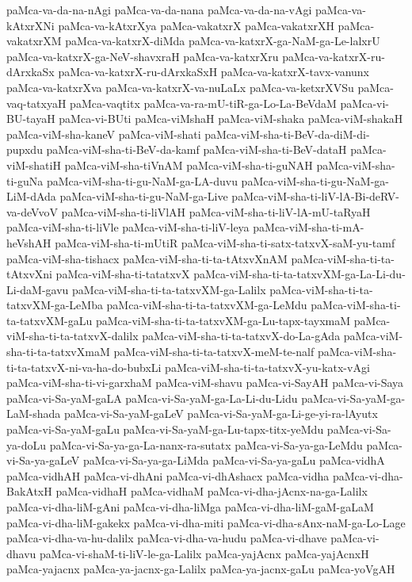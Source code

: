 {paMca-va-da-na-nAgi
paMca-va-da-nana
paMca-va-da-na-vAgi
paMca-va-kAtxrXNi
paMca-va-kAtxrXya
paMca-vakatxrX
paMca-vakatxrXH
paMca-vakatxrXM
paMca-va-katxrX-diMda
paMca-va-katxrX-ga-NaM-ga-Le-lalxrU
paMca-va-katxrX-ga-NeV-shavxraH
paMca-va-katxrXru
paMca-va-katxrX-ru-dArxkaSx
paMca-va-katxrX-ru-dArxkaSxH
paMca-va-katxrX-tavx-vanunx
paMca-va-katxrXva
paMca-va-katxrX-va-nuLaLx
paMca-va-ketxrXVSu
paMca-vaq-tatxyaH
paMca-vaqtitx
paMca-va-ra-mU-tiR-ga-Lo-La-BeVdaM
paMca-vi-BU-tayaH
paMca-vi-BUti
paMca-viMshaH
paMca-viM-shaka
paMca-viM-shakaH
paMca-viM-sha-kaneV
paMca-viM-shati
paMca-viM-sha-ti-BeV-da-diM-di-pupxdu
paMca-viM-sha-ti-BeV-da-kamf
paMca-viM-sha-ti-BeV-dataH
paMca-viM-shatiH
paMca-viM-sha-tiVnAM
paMca-viM-sha-ti-guNAH
paMca-viM-sha-ti-guNa
paMca-viM-sha-ti-gu-NaM-ga-LA-duvu
paMca-viM-sha-ti-gu-NaM-ga-LiM-dAda
paMca-viM-sha-ti-gu-NaM-ga-Live
paMca-viM-sha-ti-liV-lA-Bi-deRV-va-deVvoV
paMca-viM-sha-ti-liVlAH
paMca-viM-sha-ti-liV-lA-mU-taRyaH
paMca-viM-sha-ti-liVle
paMca-viM-sha-ti-liV-leya
paMca-viM-sha-ti-mA-heVshAH
paMca-viM-sha-ti-mUtiR
paMca-viM-sha-ti-satx-tatxvX-saM-yu-tamf
paMca-viM-sha-tishacx
paMca-viM-sha-ti-ta-tAtxvXnAM
paMca-viM-sha-ti-ta-tAtxvXni
paMca-viM-sha-ti-tatatxvX
paMca-viM-sha-ti-ta-tatxvXM-ga-La-Li-du-Li-daM-gavu
paMca-viM-sha-ti-ta-tatxvXM-ga-Lalilx
paMca-viM-sha-ti-ta-tatxvXM-ga-LeMba
paMca-viM-sha-ti-ta-tatxvXM-ga-LeMdu
paMca-viM-sha-ti-ta-tatxvXM-gaLu
paMca-viM-sha-ti-ta-tatxvXM-ga-Lu-tapx-tayxmaM
paMca-viM-sha-ti-ta-tatxvX-dalilx
paMca-viM-sha-ti-ta-tatxvX-do-La-gAda
paMca-viM-sha-ti-ta-tatxvXmaM
paMca-viM-sha-ti-ta-tatxvX-meM-te-nalf
paMca-viM-sha-ti-ta-tatxvX-ni-va-ha-do-bubxLi
paMca-viM-sha-ti-ta-tatxvX-yu-katx-vAgi
paMca-viM-sha-ti-vi-garxhaM
paMca-viM-shavu
paMca-vi-SayAH
paMca-vi-Saya
paMca-vi-Sa-yaM-gaLA
paMca-vi-Sa-yaM-ga-La-Li-du-Lidu
paMca-vi-Sa-yaM-ga-LaM-shada
paMca-vi-Sa-yaM-gaLeV
paMca-vi-Sa-yaM-ga-Li-ge-yi-ra-lAyutx
paMca-vi-Sa-yaM-gaLu
paMca-vi-Sa-yaM-ga-Lu-tapx-titx-yeMdu
paMca-vi-Sa-ya-doLu
paMca-vi-Sa-ya-ga-La-nanx-ra-sutatx
paMca-vi-Sa-ya-ga-LeMdu
paMca-vi-Sa-ya-gaLeV
paMca-vi-Sa-ya-ga-LiMda
paMca-vi-Sa-ya-gaLu
paMca-vidhA
paMca-vidhAH
paMca-vi-dhAni
paMca-vi-dhAshacx
paMca-vidha
paMca-vi-dha-BakAtxH
paMca-vidhaH
paMca-vidhaM
paMca-vi-dha-jAcnx-na-ga-Lalilx
paMca-vi-dha-liM-gAni
paMca-vi-dha-liMga
paMca-vi-dha-liM-gaM-gaLaM
paMca-vi-dha-liM-gakekx
paMca-vi-dha-miti
paMca-vi-dha-sAnx-naM-ga-Lo-Lage
paMca-vi-dha-va-hu-dalilx
paMca-vi-dha-va-hudu
paMca-vi-dhave
paMca-vi-dhavu
paMca-vi-shaM-ti-liV-le-ga-Lalilx
paMca-yajAcnx
paMca-yajAcnxH
paMca-yajacnx
paMca-ya-jacnx-ga-Lalilx
paMca-ya-jacnx-gaLu
paMca-yoVgAH
}
